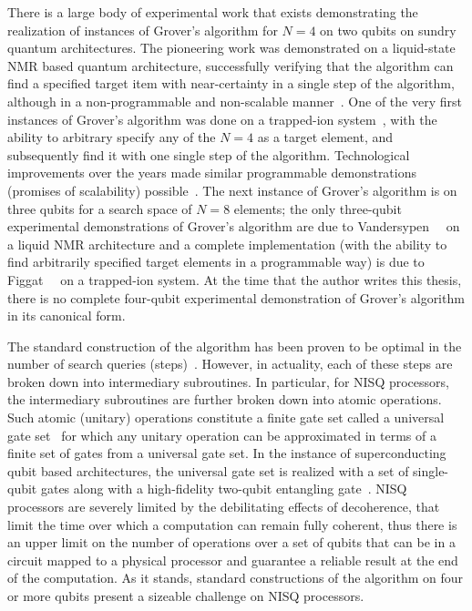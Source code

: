 \bigskip
\noindent
There is a large body of experimental work that exists demonstrating the realization of instances of Grover's algorithm for $N=4$ on two qubits on sundry quantum architectures. The pioneering work was demonstrated on a liquid-state \gls{NMR} based quantum architecture, successfully verifying that the algorithm can find a specified target item with near-certainty in a single step of the algorithm, although in a non-programmable and non-scalable manner~\cite{Chuang_1998}. One of the very first instances of Grover's algorithm was done on a trapped-ion system~\cite{Brickman_2005}, with the ability to arbitrary specify any of the $N=4$ as a target element, and subsequently find it with one single step of the algorithm. Technological improvements over the years made similar programmable demonstrations (promises of scalability) possible~\cite{DiCarlo_2009}. The next instance of Grover's algorithm is on three qubits for a search space of $N=8$ elements; the only three-qubit experimental demonstrations of Grover's algorithm are due to Vandersypen~\etal~\cite{Vandersypen_2000} on a liquid \acs{NMR} architecture and a complete implementation (with the ability to find arbitrarily specified target elements in a programmable way) is due to Figgat~\etal~\cite{Figgatt_2017} on a trapped-ion system. At the time that the author writes this thesis, there is no complete four-qubit experimental demonstration of Grover's algorithm in its canonical form.

\clearpage
\noindent
The standard construction of the algorithm has been proven to be optimal in the number of search queries (steps)~\cite{Bennett_1997,Boyer_1998,Zalka_1999}. However, in actuality, each of these steps are broken down into intermediary subroutines. In particular, for \acs{NISQ} processors, the intermediary subroutines are further broken down into atomic operations. Such atomic (unitary) operations constitute a finite gate set called a universal gate set~\cite{Dawson_2005} for which any unitary operation can be approximated in terms of a finite set of gates from a universal gate set. In the instance of superconducting qubit based architectures, the universal gate set is realized with a set of single-qubit gates along with a high-fidelity two-qubit entangling gate~\cite{Kjaergaard_2020}. \acs{NISQ} processors are severely limited by the debilitating effects of decoherence, that limit the time over which a computation can remain fully coherent, thus there is an upper limit on the number of operations over a set of qubits that can be in a circuit mapped to a physical processor and guarantee a reliable result at the end of the computation. As it stands, standard constructions of the algorithm on four or more qubits present a sizeable challenge on \acs{NISQ} processors. 

